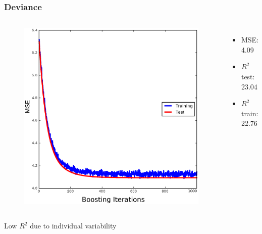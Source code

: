 \documentclass{beamer}
\begin{document}


\begin{frame}
\frametitle{Deviance}
    \vspace{-1cm}
\begin{columns}[c]    
    \centering
\begin{figure}
\includegraphics[scale=0.35]{../fig/devianceCS}
\end{figure}
  \centering
  \begin{itemize}
      \item MSE: 4.09
      \item $R^2$ test: 23.04
      \item $R^2$ train: 22.76
  \end{itemize}
\end{columns}
\centering Low $R^2$ due to individual variability 
\end{frame}

\end{document}
